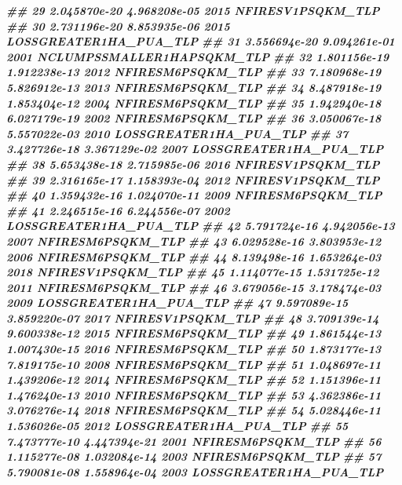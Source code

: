 \documentclass[10pt,landscape,a3paper]{article}
\newenvironment{Shaded}{\begin{snugshade}}{\end{snugshade}}
\newcommand{\DocumentationTok}[1]{\textcolor[rgb]{0.56,0.35,0.01}{\textbf{\textit{#1}}}}
\begin{document}
\begin{Shaded}
\begin{Highlighting}[]
\DocumentationTok{\#\# 29 2.045870e{-}20 4.968208e{-}05 2015          NFIRESV1PSQKM\_TLP}
\DocumentationTok{\#\# 30 2.731196e{-}20 8.853935e{-}06 2015     LOSSGREATER1HA\_PUA\_TLP}
\DocumentationTok{\#\# 31 3.556694e{-}20 9.094261e{-}01 2001 NCLUMPSSMALLER1HAPSQKM\_TLP}
\DocumentationTok{\#\# 32 1.801156e{-}19 1.912238e{-}13 2012          NFIRESM6PSQKM\_TLP}
\DocumentationTok{\#\# 33 7.180968e{-}19 5.826912e{-}13 2013          NFIRESM6PSQKM\_TLP}
\DocumentationTok{\#\# 34 8.487918e{-}19 1.853404e{-}12 2004          NFIRESM6PSQKM\_TLP}
\DocumentationTok{\#\# 35 1.942940e{-}18 6.027179e{-}19 2002          NFIRESM6PSQKM\_TLP}
\DocumentationTok{\#\# 36 3.050067e{-}18 5.557022e{-}03 2010     LOSSGREATER1HA\_PUA\_TLP}
\DocumentationTok{\#\# 37 3.427726e{-}18 3.367129e{-}02 2007     LOSSGREATER1HA\_PUA\_TLP}
\DocumentationTok{\#\# 38 5.653438e{-}18 2.715985e{-}06 2016          NFIRESV1PSQKM\_TLP}
\DocumentationTok{\#\# 39 2.316165e{-}17 1.158393e{-}04 2012          NFIRESV1PSQKM\_TLP}
\DocumentationTok{\#\# 40 1.359432e{-}16 1.024070e{-}11 2009          NFIRESM6PSQKM\_TLP}
\DocumentationTok{\#\# 41 2.246515e{-}16 6.244556e{-}07 2002     LOSSGREATER1HA\_PUA\_TLP}
\DocumentationTok{\#\# 42 5.791724e{-}16 4.942056e{-}13 2007          NFIRESM6PSQKM\_TLP}
\DocumentationTok{\#\# 43 6.029528e{-}16 3.803953e{-}12 2006          NFIRESM6PSQKM\_TLP}
\DocumentationTok{\#\# 44 8.139498e{-}16 1.653264e{-}03 2018          NFIRESV1PSQKM\_TLP}
\DocumentationTok{\#\# 45 1.114077e{-}15 1.531725e{-}12 2011          NFIRESM6PSQKM\_TLP}
\DocumentationTok{\#\# 46 3.679056e{-}15 3.178474e{-}03 2009     LOSSGREATER1HA\_PUA\_TLP}
\DocumentationTok{\#\# 47 9.597089e{-}15 3.859220e{-}07 2017          NFIRESV1PSQKM\_TLP}
\DocumentationTok{\#\# 48 3.709139e{-}14 9.600338e{-}12 2015          NFIRESM6PSQKM\_TLP}
\DocumentationTok{\#\# 49 1.861544e{-}13 1.007430e{-}15 2016          NFIRESM6PSQKM\_TLP}
\DocumentationTok{\#\# 50 1.873177e{-}13 7.819175e{-}10 2008          NFIRESM6PSQKM\_TLP}
\DocumentationTok{\#\# 51 1.048697e{-}11 1.439206e{-}12 2014          NFIRESM6PSQKM\_TLP}
\DocumentationTok{\#\# 52 1.151396e{-}11 1.476240e{-}13 2010          NFIRESM6PSQKM\_TLP}
\DocumentationTok{\#\# 53 4.362386e{-}11 3.076276e{-}14 2018          NFIRESM6PSQKM\_TLP}
\DocumentationTok{\#\# 54 5.028446e{-}11 1.536026e{-}05 2012     LOSSGREATER1HA\_PUA\_TLP}
\DocumentationTok{\#\# 55 7.473777e{-}10 4.447394e{-}21 2001          NFIRESM6PSQKM\_TLP}
\DocumentationTok{\#\# 56 1.115277e{-}08 1.032084e{-}14 2003          NFIRESM6PSQKM\_TLP}
\DocumentationTok{\#\# 57 5.790081e{-}08 1.558964e{-}04 2003     LOSSGREATER1HA\_PUA\_TLP}

\end{Highlighting}
\end{Shaded}
\end{document}
